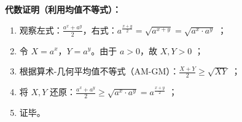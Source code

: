 \begin{proofbox}
\textbf{代数证明（利用均值不等式）：}
\begin{enumerate}
    \item 观察左式：$\frac{a^x + a^y}{2}$，右式：$a^{\frac{x+y}{2}} = \sqrt{a^{x+y}} = \sqrt{a^x \cdot a^y}$ ；
    \item 令 $X = a^x$，$Y = a^y$。由于 $a > 0$，故 $X, Y > 0$ ；
    \item 根据算术-几何平均值不等式（AM-GM）：$\frac{X+Y}{2} \geqslant \sqrt{XY}$ ；
    \item 将 $X, Y$ 还原：$\frac{a^x + a^y}{2} \geqslant \sqrt{a^x \cdot a^y} = a^{\frac{x+y}{2}}$ ；
    \item 证毕。
\end{enumerate}
\end{proofbox}